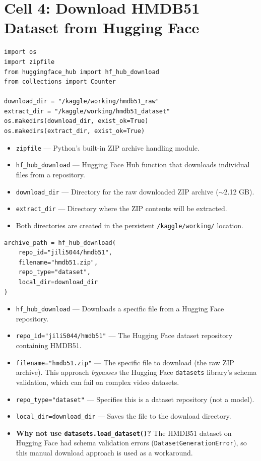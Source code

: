 \section{Cell 4: Download HMDB51 Dataset from Hugging Face}

\begin{lstlisting}
import os
import zipfile
from huggingface_hub import hf_hub_download
from collections import Counter

download_dir = "/kaggle/working/hmdb51_raw"
extract_dir = "/kaggle/working/hmdb51_dataset"
os.makedirs(download_dir, exist_ok=True)
os.makedirs(extract_dir, exist_ok=True)
\end{lstlisting}

\begin{explanation}
\begin{itemize}[nosep]
  \item \texttt{zipfile} --- Python's built-in ZIP archive handling module.
  \item \texttt{hf\_hub\_download} --- Hugging Face Hub function that downloads individual files from a repository.
  \item \texttt{download\_dir} --- Directory for the raw downloaded ZIP archive ($\sim$2.12 GB).
  \item \texttt{extract\_dir} --- Directory where the ZIP contents will be extracted.
  \item Both directories are created in the persistent \texttt{/kaggle/working/} location.
\end{itemize}
\end{explanation}

\begin{lstlisting}
archive_path = hf_hub_download(
    repo_id="jili5044/hmdb51",
    filename="hmdb51.zip",
    repo_type="dataset",
    local_dir=download_dir
)
\end{lstlisting}

\begin{explanation}
\begin{itemize}[nosep]
  \item \texttt{hf\_hub\_download} --- Downloads a specific file from a Hugging Face repository.
  \item \texttt{repo\_id="jili5044/hmdb51"} --- The Hugging Face dataset repository containing HMDB51.
  \item \texttt{filename="hmdb51.zip"} --- The specific file to download (the raw ZIP archive). This approach \textit{bypasses} the Hugging Face \texttt{datasets} library's schema validation, which can fail on complex video datasets.
  \item \texttt{repo\_type="dataset"} --- Specifies this is a dataset repository (not a model).
  \item \texttt{local\_dir=download\_dir} --- Saves the file to the download directory.
  \item \textbf{Why not use \texttt{datasets.load\_dataset()}?} The HMDB51 dataset on Hugging Face had schema validation errors (\texttt{DatasetGenerationError}), so this manual download approach is used as a workaround.
\end{itemize}
\end{explanation}

